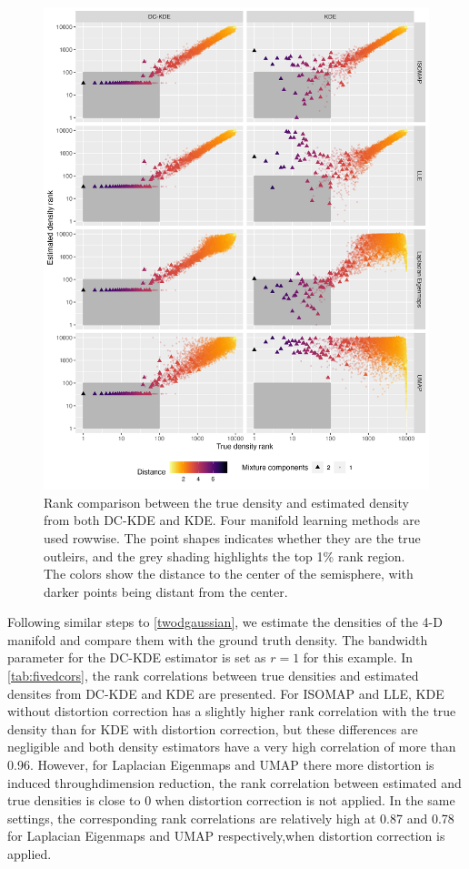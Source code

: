 \documentclass[11pt,a4paper,]{article}
\begin{document}
\begin{figure}

{\centering \includegraphics[width=0.95\linewidth]{figures/sim4d10000_density_comparison_4ml_radius10_k200_rankdensity_circleoutlier_with1rec} 

}

\caption{Rank comparison between the true density and estimated density from both DC-KDE and KDE. Four manifold learning methods are used rowwise. The point shapes indicates whether they are the true outleirs, and the grey shading highlights the top 1\% rank region. The colors show the distance to the center of the semisphere, with darker points being distant from the center.}\label{fig:fivedisomapden}
\end{figure}

Following similar steps to \autoref{twodgaussian}, we estimate the densities of the 4-D manifold and compare them with the ground truth density. The bandwidth parameter for the DC-KDE estimator is set as \(r=1\) for this example. In \autoref{tab:fivedcors}, the rank correlations between true densities and estimated densites from DC-KDE and KDE are presented. For ISOMAP and LLE, KDE without distortion correction has a slightly higher rank correlation with the true density than for KDE with distortion correction, but these differences are negligible and both density estimators have a very high correlation of more than 0.96. However, for Laplacian Eigenmaps and UMAP there more distortion is induced throughdimension reduction, the rank correlation between estimated and true densities is close to 0 when distortion correction is not applied. In the same settings, the corresponding rank correlations are relatively high at 0.87 and 0.78 for Laplacian Eigenmaps and UMAP respectively,when distortion correction is applied.
\end{document}
